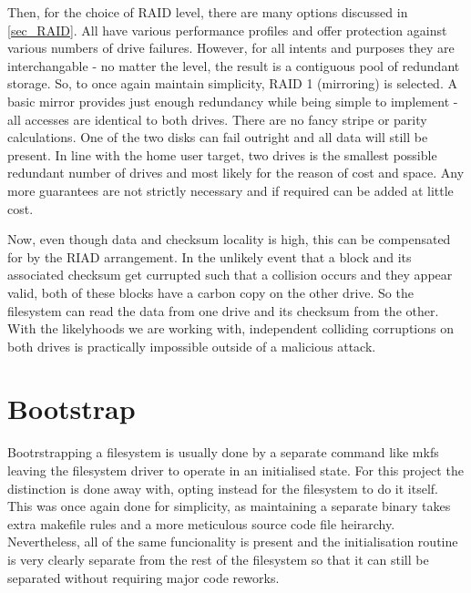         Then, for the choice of RAID level, there are many options discussed in
        \ref{sec_RAID}. All have various performance profiles and offer
        protection against various numbers of drive failures. However, for all
        intents and purposes they are interchangable - no matter the level, the
        result is a contiguous pool of redundant storage. So, to once again
        maintain simplicity, RAID 1 (mirroring) is selected. A basic mirror
        provides just enough redundancy while being simple to implement - all
        accesses are identical to both drives. There are no fancy stripe or
        parity calculations. One of the two disks can fail outright and all
        data will still be present. In line with the home user target, two
        drives is the smallest possible redundant number of drives and most
        likely for the reason of cost and space. Any more guarantees are not
        strictly necessary and if required can be added at little cost.

        Now, even though data and checksum locality is high, this can be
        compensated for by the RIAD arrangement. In the unlikely event that a
        block and its associated checksum get currupted such that a collision
        occurs and they appear valid, both of these blocks have a carbon copy
        on the other drive. So the filesystem can read the data from one drive
        and its checksum from the other. With the likelyhoods we are working
        with, independent colliding corruptions on both drives is practically
        impossible outside of a malicious attack.

    \section{Bootstrap}

        Bootrstrapping a filesystem is usually done by a separate command like
        mkfs \cite{man_mkfs} leaving the filesystem driver to operate in an
        initialised state. For this project the distinction is done away with,
        opting instead for the filesystem to do it itself. This was once again
        done for simplicity, as maintaining a separate binary takes extra
        makefile rules and a more meticulous source code file heirarchy.
        Nevertheless, all of the same funcionality is present and the
        initialisation routine is very clearly separate from the rest of the
        filesystem so that it can still be separated without requiring major
        code reworks.

